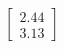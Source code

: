 \documentclass[preview]{standalone}
\begin{document}
\begin{align*}
\begin{bmatrix} 2.44 \\ 3.13 \end{bmatrix}
\end{align*}
\end{document}

